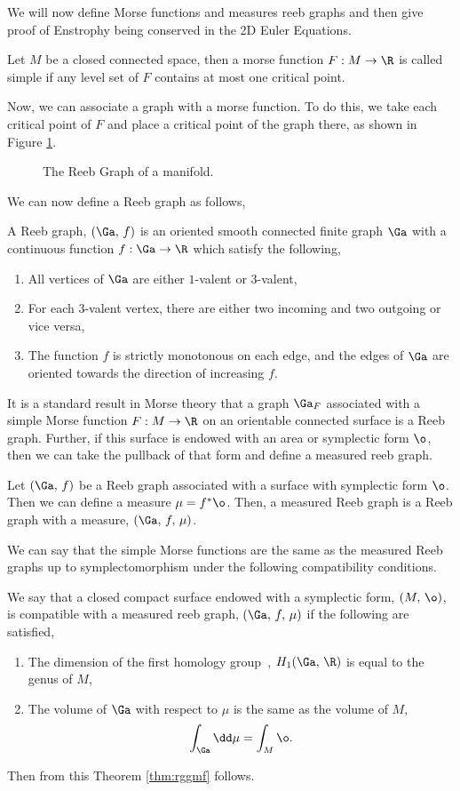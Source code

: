 \noindent
We will now define Morse functions and measures reeb graphs and then give proof of Enstrophy being conserved in the 2D Euler Equations.
\begin{ndefi}
  Let $M$ be a closed connected space, then a morse function $F : M \to \R$ is called simple if any level set of $F$ contains at most one critical point.
\end{ndefi}
\noindent
Now, we can associate a graph with a morse function. To do this, we take each critical point of $F$ and place a critical point of the graph there, as shown in Figure \ref{fig:reeb}.
\begin{figure}[!ht]
\centering
\resizebox{0.6\textwidth}{!}{}
\caption{The Reeb Graph of a manifold.}
\label{fig:reeb}
\end{figure}
\noindent
We can now define a Reeb graph as follows,
\begin{ndefi}
  A Reeb  graph, $(\Ga,\, f)$ is an oriented smooth connected finite graph $\Ga$ with a continuous function $f : \Ga \to \R$ which satisfy the following,
  \begin{enumerate}
    \item All vertices of $\Ga$ are either $1$-valent or $3$-valent,
    \item For each $3$-valent vertex, there are either two incoming and two outgoing or vice versa,
    \item The function $f$ is strictly monotonous on each edge, and the edges of $\Ga$ are oriented towards the direction of increasing $f$.
  \end{enumerate}
\end{ndefi}
\noindent
It is a standard result in Morse theory that a graph $\Ga_F$ associated with a simple Morse function $F : M \to \R$ on an orientable connected surface is a Reeb graph. Further, if this surface is endowed with an area or symplectic form $\o$, then we can take the pullback of that form and define a measured reeb graph.
\begin{ndefi}
  Let $(\Ga,\, f)$ be a Reeb graph associated with a surface with symplectic form $\o$. Then we can define a measure $\mu = f^*\o$. Then, a measured Reeb graph is a Reeb graph with a measure, $(\Ga,\, f,\, \mu)$.
\end{ndefi}
\noindent
We can say that the simple Morse functions are the same as the measured Reeb graphs up to symplectomorphism under the following compatibility conditions.
\begin{ndefi}[Compatible]
  We say that a closed compact surface endowed with a symplectic form, $(M,\, \o)$, is compatible with a measured reeb graph, $(\Ga,\, f,\, \mu)$ if the following are satisfied,
	\begin{enumerate}
		\item The dimension of the first homology group~\cite{hatcher}, $H_1(\Ga,\, \R)$ is equal to the genus of $M$,
		\item The volume of $\Ga$ with respect to $\mu$ is the same as the volume of $M$,
		$$ \int_\Ga \dd \mu = \int_M \o. $$
	\end{enumerate}
\end{ndefi}
\noindent
Then from this Theorem \ref{thm:rggmf} follows.

